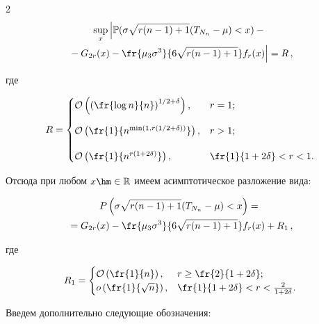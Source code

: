 \begin{multicols}{2}
\begin{multline*}

\sup\limits_{x} \left| 

\vphantom{\fr{\mu_3 \sigma^{3}}{6\sqrt{r(n-1)+1}}}

\mathbb{P}(\sigma\sqrt{r(n-1)+1}(T_{N_n}-\mu)<x) -{} \right. \\

 \left. {}-G_{2r}(x)-\fr{\mu_3 \sigma^{3}}{6\sqrt{r(n-1)+1}}f_r(x)\right| =R\,,

\end{multline*}

где 

$$R = \begin{cases}

\mathcal{O}\left(\left(\fr{\log{n}}{n}\right)^{{1}/{2}+\delta}\right) , & r=1; \\[12pt]

\mathcal{O}\left(

\fr{1}{n^{\min(1, r({1}/{2}+\delta))}}\right), & r>1;\\[12pt]

 \mathcal{O}\left(\fr{1}{n^{r(1+2\delta)}}\right), & \fr{1}{1+2\delta}<r<1.

        \end{cases}

        $$

Отсюда при любом $x \hm\in \mathbb{R}$ имеем асимптотическое разложение вида:

 \begin{multline}

P\left(\sigma\sqrt{r(n-1)+1}(T_{N_n}-\mu)<x\right) ={}\\

{} = G_{2r}(x) -\fr{\mu_3 \sigma^{3}}{6\sqrt{r(n-1)+1}}f_r(x)+R_1\,,

\label{e4-u}

\end{multline}

где

$$ 

R_1 = \begin{cases}      \mathcal{O}\left(\fr{1}{n}\right)          , & r\ge \fr{2}{1+2\delta} ; \\

                            o\left(\fr{1}{\sqrt{n}}\right)             , & \fr{1}{1+2\delta}<r<\frac{2}{1+2\delta}.

            \end{cases}$$

Введем дополнительно следующие обозначения:


\end{multicols}
